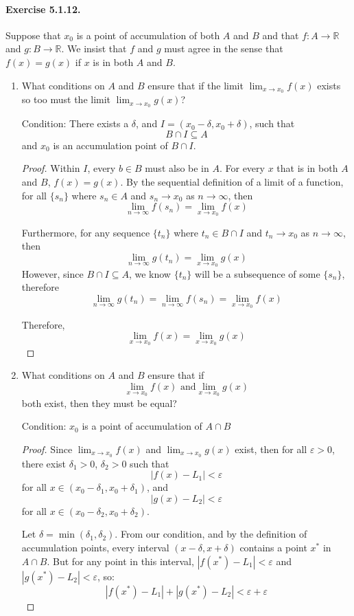 \documentclass[11pt]{article}
\def \R {\mathbb{R}}
\def \epsilon {\varepsilon}
\newcommand{\set}[1]{\{#1\}}
\def \limittoinfyn {\lim_{n \to \infty}}
\def \limitToXZero {\lim_{x \to x_0}}
\def \sn {s_n}
\def \tn {t_n}
\begin{document}
\paragraph{Exercise 5.1.12.} Suppose that $x_0$ is a point of accumulation of both $A$ and $B$ and that $f:A \to \R$ and $g:B \to \R$.
We insist that $f$ and $g$ must agree in the sense that $f(x) = g(x)$ if $x$ is in both $A$ and $B$.
\begin{enumerate}[label=(\alph*)]
	\item What conditions on $A$ and $B$ ensure that if the limit $\limitToXZero f(x)$ exists so too must the limit $\limitToXZero g(x)$?

	Condition: There exists a $ \delta $, and $ I = (x_0 - \delta, x_0 + \delta) $, such that $$ B \cap I \subseteq A $$ and $ x_0 $ is an accumulation point of $ B \cap I $.
	\begin{proof}
		Within $ I $, every $b \in B $ must also be in $ A $. For every $ x $ that is in both $ A $ and $ B $, $ f(x) = g(x) $. By the sequential definition of a limit of a function, for all $ \set{\sn} $ where $ \sn \in A $ and $ \sn \to x_0$ as $ n \to \infty $, then $$ \limittoinfyn f(\sn) = \limitToXZero f(x)$$ 
		
		Furthermore, for any sequence $ \set{\tn} $ where $ \tn \in B \cap I$ and $ \tn \to x_0$ as $ n \to \infty $, then $$ \limittoinfyn g(\tn) = \limitToXZero g(x)$$
		However, since $B \cap I \subseteq A$, we know $ \set{\tn} $ will be a subsequence of some $ \set{\sn}$, therefore $$ \limittoinfyn g(\tn) = \limittoinfyn f(\sn) = \limitToXZero f(x)$$
		
		Therefore, $$ \limitToXZero f(x) = \limitToXZero g(x) $$
	\end{proof}

	\item What conditions on $A$ and $B$ ensure that if
    \[ \lim_{x \rightarrow x_0} f(x) \text{ and} \lim_{x \rightarrow x_0} g(x) \]
    both exist, then they must be equal?

	Condition: $ x_0 $ is a point of accumulation of $ A \cap B $
	\begin{proof}
		Since $ \limitToXZero f(x) $ and $ \limitToXZero g(x) $ exist, then for all $ \epsilon > 0 $, there exist $ \delta_1 > 0$, $\delta_2 >0 $ such that $$ |f(x) - L_1| < \epsilon $$ for all $x \in (x_0 - \delta_1, x_0 + \delta_1)$, and $$ |g(x) - L_2| < \epsilon $$ for all $x \in (x_0 - \delta_2, x_0 + \delta_2)$. 
		
		Let $ \delta = \min(\delta_1, \delta_2) $. From our condition, and by the definition of accumulation points, every interval $ (x - \delta, x + \delta) $ contains a point $x^*$ in $ A \cap B $. But for any point in this interval, $ |f(x^*) - L_1| < \epsilon $ and $ |g(x^*) - L_2| < \epsilon $, so:
			$$ |f(x^*) - L_1| + |g(x^*) - L_2| < \epsilon + \epsilon $$
		

\end{proof}
\end{enumerate}
\end{document}
